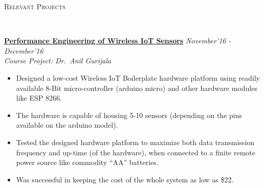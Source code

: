 \documentclass[10pt]{article}
\newenvironment{changemargin}[2]{%
    \begin{list}{}{%
            \setlength{\topsep}{0pt}%
            \setlength{\leftmargin}{#1}%
            \setlength{\rightmargin}{#2}%
            \setlength{\listparindent}{\parindent}%
        \setlength{\itemindent}{\parindent}%
            \setlength{\parsep}{\parskip}%
        }%
\item[]}{\end{list}
}
\newcommand{\lineover}{
    \begin{changemargin}{-0.05in}{-0.10in}
        \vspace*{-8pt}
        \hrulefill \\
        \vspace*{-2pt}
    \end{changemargin}
}
\newcommand{\header}[1]{
    \begin{changemargin}{-0.75in}{-0.75in}
        \scshape{#1}\\
        \lineover
    \end{changemargin}
}
\newenvironment{body} {
    \vspace*{-16pt}
    \begin{changemargin}{-0.6in}{-0.65in}
    }   
    {\end{changemargin}
}
\begin{document}
\newpage
 \header{Relevant Projects}

 \begin{body}
     \vspace{14pt}
    

    \href{https://researchweb.iiit.ac.in/~shaleen.garg/files/Perf_engg_project.pdf}{\textbf{Performance Engineering of Wireless IoT Sensors}} \hfill \emph{November'16 - December'16}\\
    \emph{Course Project: Dr.~Anil Gurijala}
    \begin{itemize}
        \item{Designed a low-cost Wireless IoT Boilerplate hardware platform using readily available 8-Bit micro-controller (arduino micro) and other hardware modules like ESP 8266.}
        \item{The hardware is capable of housing 5-10 sensors (depending on the pins available on the arduino model).}
        \item{Tested the designed hardware platform to maximize both data transmission frequency and up-time (of the hardware), when connected to a finite remote power source like commodity ``AA'' batteries.}
        \item{Was successful in keeping the cost of the whole system as low as \$22.}
    \end{itemize}
     \smallskip


\end{body}
\end{document}
